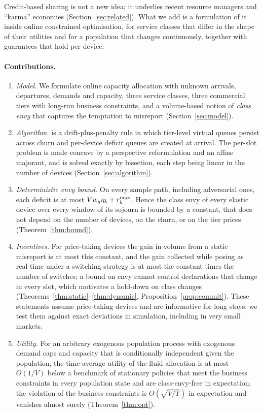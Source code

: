 Credit-based sharing is not a new idea; it underlies recent resource managers and ``karma'' economies (Section~\ref{sec:related}).
What we add is a formulation of it inside online constrained optimisation, for service classes that differ in the shape of their utilities and for a population that changes continuously, together with guarantees that hold per device.

\paragraph{Contributions.}
\begin{enumerate}[leftmargin=*,itemsep=2pt]
\item \emph{Model.} We formulate online capacity allocation with unknown arrivals, departures, demands and capacity, three service classes, three commercial tiers with long-run business constraints, and a volume-based notion of \emph{class envy} that captures the temptation to misreport (Section~\ref{sec:model}).
\item \emph{Algorithm.} \repay{} is a drift-plus-penalty rule in which tier-level virtual queues persist across churn and per-device deficit queues are created at arrival. The per-slot problem is made concave by a perspective reformulation and an affine majorant, and is solved exactly by bisection, each step being linear in the number of devices (Section~\ref{sec:algorithm}).
\item \emph{Deterministic envy bound.} On every sample path, including adversarial ones, each deficit is at most $V w_g\eta_k+r^{\max}_k$. Hence the class envy of every elastic device over every window of its sojourn is bounded by a constant, that does not depend on the number of devices, on the churn, or on the tier prices (Theorem~\ref{thm:bound}).
\item \emph{Incentives.} For price-taking devices the gain in volume from a static misreport is at most this constant, and the gain collected while posing as real-time under a switching strategy is at most the constant times the number of switches; a bound on envy cannot control declarations that change in every slot, which motivates a hold-down on class changes (Theorems~\ref{thm:static}--\ref{thm:dynamic}, Proposition~\ref{prop:commit}). These statements assume price-taking devices and are informative for long stays; we test them against exact deviations in simulation, including in very small markets.
\item \emph{Utility.} For an arbitrary exogenous population process with exogenous demand caps and capacity that is conditionally independent given the population, the time-average utility of the fluid allocation is at most $O(1/V)$ below a benchmark of stationary policies that meet the business constraints in every population state and are class-envy-free in expectation; the violation of the business constraints is $O(\sqrt{V/T})$ in expectation and vanishes almost surely (Theorem~\ref{thm:opt}).

\end{enumerate}
